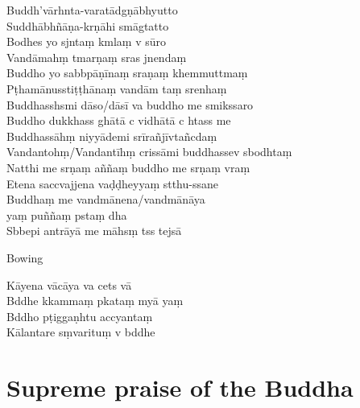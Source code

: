 Buddh'vārhnta-varatādgṇābhyutto\\
Suddhābhñāṇa-krṇāhi smāgtatto\\
Bodhes yo sjntaṃ kmlaṃ v sūro\\
Vandāmahṃ tmarṇaṃ sras jnendaṃ\\
Buddho yo sabbpāṇīnaṃ sraṇaṃ khemmuttmaṃ\\
Pṭhamānusstiṭṭhānaṃ vandām taṃ srenhaṃ\\
Buddhasshsmi dāso/dāsī va buddho me smikssaro\\
Buddho dukkhass ghātā c vidhātā c htass me\\
Buddhassāhṃ niyyādemi srīrañjīvtañcdaṃ\\
Vandantohṃ/Vandantīhṃ crissāmi buddhassev sbodhtaṃ\\
Natthi me srṇaṃ aññaṃ buddho me srṇaṃ vraṃ\\
Etena saccvajjena vaḍḍheyyaṃ stthu-ssane\\
Buddhaṃ me vandmānena/vandmānāya\\
\vin yaṃ puññaṃ pstaṃ dha\\
Sbbepi antrāyā me māhsṃ tss tejsā

\begin{instruction}
  Bowing
\end{instruction}

Kāyena vācāya va cets vā\\
Bddhe kkammaṃ pkataṃ myā yaṃ\\
Bddho pṭiggaṇhtu accyantaṃ\\
Kālantare sṃvarituṃ v bddhe

\clearpage

\chapter{Supreme praise of the Buddha}%

\begin{leader}
\end{leader}

